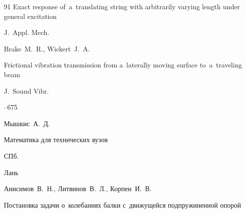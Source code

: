 \begin{thebibliography}{91}
\paper Exact response of~a~translating string with arbitrarily varying length under general excitation

\jour J.~Appl. Mech.















\by Brake~M.~R., Wickert~J.~A.

\paper Frictional vibration transmission from a~laterally moving surface to~a~traveling beam

\jour J.~Sound Vibr.




--675











\by Мышкис~А.~Д.

\book Математика для технических вузов

\publaddr СПб.

\publ Лань













\by Анисимов~В.~Н., Литвинов~В.~Л., Корпен~И.~В.

\paper Постановка задачи о~колебаниях балки с~движущейся подпружиненной опорой


\end{thebibliography}

